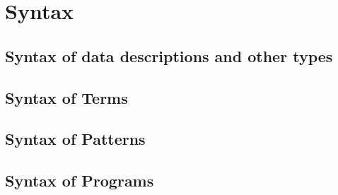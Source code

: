 \appendix

\section{Syntax}
\subsection{Syntax of data descriptions and other types}
\label{app:syntax-dd}


\subsection{Syntax of Terms}
\label{app:syntax-terms}

  
\subsection{Syntax of Patterns}
\label{app:syntax-pat}


\subsection{Syntax of Programs}
\label{app:syntax-prog}


